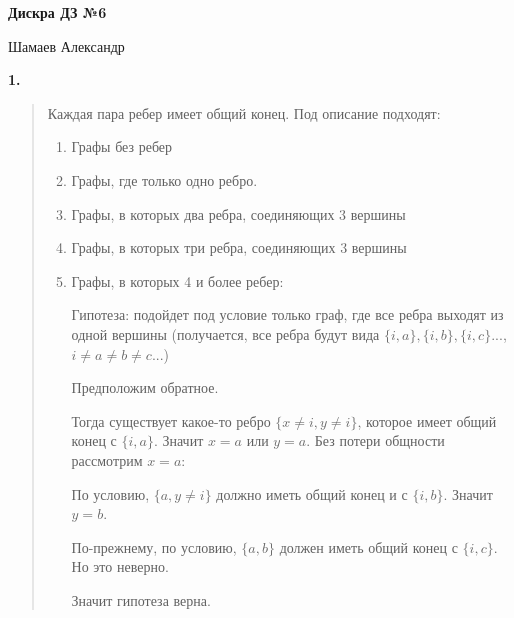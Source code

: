 \documentclass{article}
\begin{document}
\setlength{\parindent}{0pt}
\begin{Large}
    \textsf{\textbf{Дискра ДЗ №6}}
    
    Шамаев Александр    
\end{Large}
\vspace{1cm}



\textsf{\textbf{1.}}
\begin{quote}
Каждая пара ребер имеет общий конец. Под описание подходят:
\begin{enumerate}
    \item Графы без ребер
    \item Графы, где только одно ребро. 
    \item Графы, в которых два ребра, соединяющих 3 вершины
    \item Графы, в которых три ребра, соединяющих 3 вершины
    \item Графы, в которых 4 и более ребер:

    Гипотеза: подойдет под условие только граф, где все ребра выходят из одной вершины (получается, все ребра будут вида $\{i, a\}, \{i, b\}, \{i, c\} ...$, $i \neq a \neq b \neq c ...$)

    Предположим обратное. 
    
    Тогда существует какое-то ребро $\{x \neq i, y \neq i\}$, которое имеет общий конец с $\{i, a\}$. Значит $x = a$ или $y = a$. Без потери общности рассмотрим $x = a$:

   По условию, $\{a, y \neq i \}$ должно иметь общий конец и с $\{i, b\}$. Значит $y = b$.

   По-прежнему, по условию, $\{a, b\}$ должен иметь общий конец с $\{i, c \}$. Но это неверно.

   Значит гипотеза верна.
    
\end{enumerate}
\end{quote}
\end{document}
